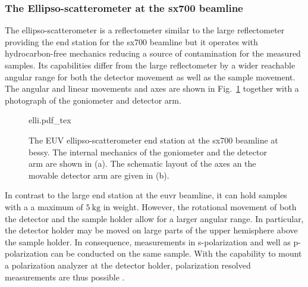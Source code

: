 \subsubsection{The Ellipso-scatterometer at the \gls{sx700} beamline}
The ellipso-scatterometer is a reflectometer similar to the large reflectometer providing the end station for the \gls{sx700} beamline but it operates with hydrocarbon-free mechanics reducing a source of contamination for the measured samples. Its capabilities differ from the large reflectometer by a wider reachable angular range for both the detector movement as well as the sample movement. The angular and linear movements and axes are shown in Fig.~\ref{ch_exp:fig_elli} together with a photograph of the goniometer and detector arm.
\begin{figure}[htb]
    \def\svgwidth{\textwidth}
    {elli.pdf_tex}
    \caption[The EUV ellipso-scatterometer.]{The EUV ellipso-scatterometer end station at the \gls{sx700} beamline at \gls{bessy}. The internal mechanics of the goniometer and the detector arm are shown in (a). The schematic layout of the axes an the movable detector arm are given in (b).}
    \label{ch_exp:fig_elli}
\end{figure}
In contrast to the large end station at the \gls{euvr} beamline, it can hold samples with a a maximum of $\SI{5}{\kg}$ in weight. However, the rotational movement of both the detector and the sample holder allow for a larger angular range. In particular, the detector holder may be moved on large parts of the upper hemisphere above the sample holder. In consequence, measurements in s-polarization and well as p-polarization can be conducted on the same sample. With the capability to mount a polarization analyzer at the detector holder, polarization resolved measurements are thus possible \cite{soltwisch_polarization_2015}.


